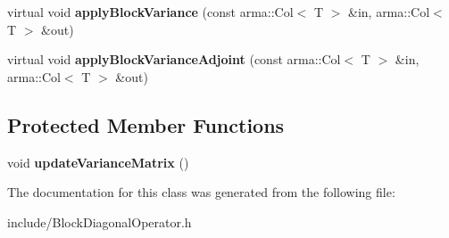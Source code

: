 \begin{DoxyCompactItemize}
\item 
virtual void {\bfseries apply\+Block\+Variance} (const arma\+::\+Col$<$ T $>$ \&in, arma\+::\+Col$<$ T $>$ \&out)\hypertarget{classkl1p_1_1TBlockDiagonalOperator_aafd45b42f432a8bf57b207c58ce44817}{}\label{classkl1p_1_1TBlockDiagonalOperator_aafd45b42f432a8bf57b207c58ce44817}

\item 
virtual void {\bfseries apply\+Block\+Variance\+Adjoint} (const arma\+::\+Col$<$ T $>$ \&in, arma\+::\+Col$<$ T $>$ \&out)\hypertarget{classkl1p_1_1TBlockDiagonalOperator_aa8d9ac9d10de8b125eb2fcc19dd12ffa}{}\label{classkl1p_1_1TBlockDiagonalOperator_aa8d9ac9d10de8b125eb2fcc19dd12ffa}

\end{DoxyCompactItemize}
\subsection*{Protected Member Functions}
\begin{DoxyCompactItemize}
\item 
void {\bfseries update\+Variance\+Matrix} ()\hypertarget{classkl1p_1_1TBlockDiagonalOperator_ac91ba0e41a0bb6420c591198493a2ea9}{}\label{classkl1p_1_1TBlockDiagonalOperator_ac91ba0e41a0bb6420c591198493a2ea9}

\end{DoxyCompactItemize}


The documentation for this class was generated from the following file\+:\begin{DoxyCompactItemize}
\item 
include/Block\+Diagonal\+Operator.\+h\end{DoxyCompactItemize}
